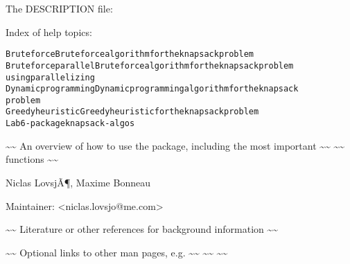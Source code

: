 \documentclass[a4paper]{book}
\begin{document}
\begin{Details}\relax

The DESCRIPTION file:


Index of help topics:
\begin{alltt}
Brute force             Brute force algorithm for the knapsack problem
Brute force parallel    Brute force algorithm for the knapsack problem
                        using parallelizing
Dynamic programming     Dynamic programming algorithm for the knapsack
                        problem
Greedy heuristic        Greedy heuristic for the knapsack problem
Lab6-package            knapsack-algos
\end{alltt}

\textasciitilde{}\textasciitilde{} An overview of how to use the package, including the most important \textasciitilde{}\textasciitilde{}
\textasciitilde{}\textasciitilde{} functions \textasciitilde{}\textasciitilde{}
\end{Details}
%
\begin{Author}\relax
Niclas LovsjÃ¶, Maxime Bonneau

Maintainer: <niclas.lovsjo@me.com>
\end{Author}
%
\begin{References}\relax
\textasciitilde{}\textasciitilde{} Literature or other references for background information \textasciitilde{}\textasciitilde{}
\end{References}
%
\begin{SeeAlso}\relax
\textasciitilde{}\textasciitilde{} Optional links to other man pages, e.g. \textasciitilde{}\textasciitilde{}
\textasciitilde{}\textasciitilde{}  \textasciitilde{}\textasciitilde{}
\end{SeeAlso}
\end{document}
